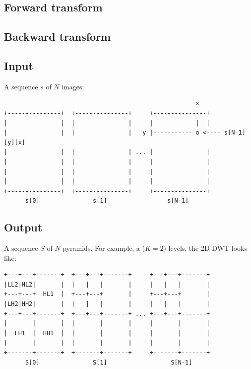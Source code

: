 \subsection{Forward transform}


\subsection{Backward transform}


\subsection{Input}
A sequence \(s\) of \(N\) images:

\begin{verbatim}
                                                      x 
+---------------+  +---------------+     +---------------+
|               |  |               |     |            |  |
|               |  |               |   y |----------- o <---- s[N-1][y][x]
|               |  |               | ... |               |
|               |  |               |     |               |
|               |  |               |     |               |
|               |  |               |     |               |
+---------------+  +---------------+     +---------------+
      s[0]               s[1]                 s[N-1]
\end{verbatim}

\subsection{Output}
A sequence \(S\) of \(N\) pyramids. For example, a (\(K=2\))-levels, the
2D-DWT looks like:

\begin{verbatim}
+---+---+-------+  +---+---+-------+     +---+---+-------+
|LL2|HL2|       |  |   |   |       |     |   |   |       |
+---+---+  HL1  |  +---+---+       |     +---+---+       |
|LH2|HH2|       |  |   |   |       |     |   |   |       |
+---+---+-------+  +---+---+-------+ ... +---+---+-------+
|       |       |  |       |       |     |       |       |
|  LH1  |  HH1  |  |       |       |     |       |       |
|       |       |  |       |       |     |       |       |        
+-------+-------+  +-------+-------+     +-------+-------+
      S[0]               S[1]                  S[N-1]
\end{verbatim}



